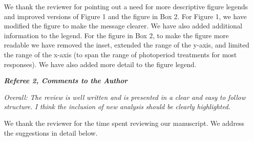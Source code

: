 \documentclass{article}
\begin{document}
\par We thank the reviewer for pointing out a need for more descriptive figure legends and improved versions of Figure 1 and the figure in Box 2.
For Figure 1, we have modified the figure to make the message clearer. We have also added additional information to the legend.
For the figure in Box 2,  to make the figure more readable we have removed the inset, extended the range of the y-axis, and limited the range of the x-axis (to span the range of photoperiod treatments for most responses). We have also added more detail to the figure legend.


\emph{{\bf Referee 2, Comments to the Author}}
\par \emph{Overall: The review is well written and is presented in a clear and easy to follow structure. I think the inclusion of new analysis should be clearly highlighted.}

\par We thank the reviewer for the time spent reviewing our manuscript. We address the suggestions in detail below. 
\end{document}
